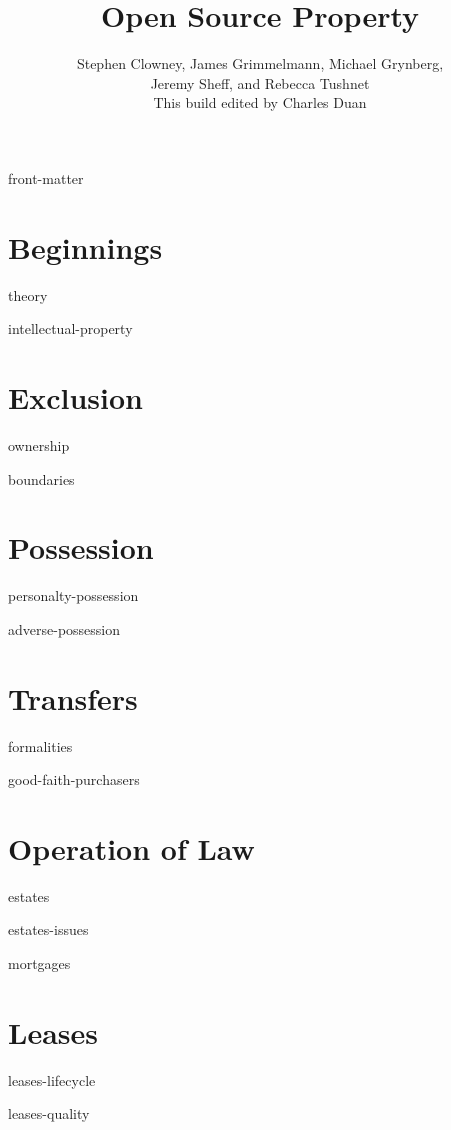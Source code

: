 \documentclass[12pt]{book}
\title{Open Source Property}
\author{Stephen Clowney, James Grimmelmann, Michael Grynberg,\\
Jeremy Sheff, and Rebecca Tushnet \\[12pt]
This build edited by Charles Duan}
\begin{document}
\sloppy
\raggedbottom
\frenchspacing
{}                                                
\parskip=0pt                                                  


\frontmatter

\maketitle

\tableofcontents

\module front-matter

\mainmatter

\part{Beginnings}

\module theory

\module intellectual-property

\part{Exclusion}

\module ownership

\module boundaries

\part{Possession}

\module personalty-possession

\module adverse-possession


\part{Transfers}

\module formalities

\module good-faith-purchasers


\part{Operation of Law}

\module estates

\module estates-issues

\module mortgages

\part{Leases}

\module leases-lifecycle

\module leases-quality
\end{document}

